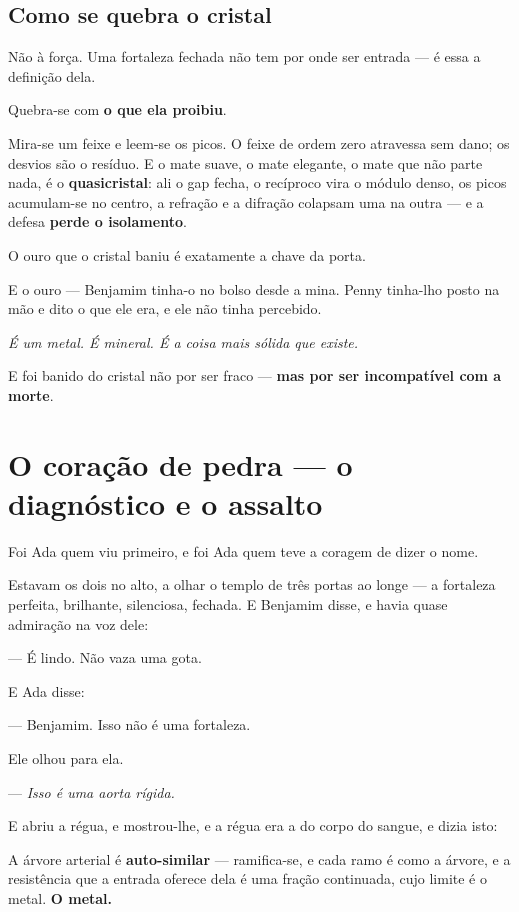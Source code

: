 \documentclass[livro.tex]{subfiles}
\begin{document}
\section*{Como se quebra o cristal}

Não à força. Uma fortaleza fechada não tem por onde ser entrada --- é essa a definição dela.

Quebra-se com \textbf{o que ela proibiu}.

Mira-se um feixe e leem-se os picos. O feixe de ordem zero atravessa sem dano; os desvios são o resíduo. E o mate
suave, o mate elegante, o mate que não parte nada, é o \textbf{quasicristal}: ali o gap fecha, o recíproco vira o
módulo denso, os picos acumulam-se no centro, a refração e a difração colapsam uma na outra --- e a
defesa \textbf{perde o isolamento}.

O ouro que o cristal baniu é exatamente a chave da porta.

E o ouro --- Benjamim tinha-o no bolso desde a mina. Penny tinha-lho posto na mão e
dito o que ele era, e ele não tinha percebido.

\emph{É um metal. É mineral. É a coisa mais sólida que existe.}

E foi banido do cristal não por ser fraco --- \textbf{mas por ser incompatível com a morte}.


\chapter{O coração de pedra --- o diagnóstico e o assalto}

Foi Ada quem viu primeiro, e foi Ada quem teve a coragem de dizer o nome.

Estavam os dois no alto, a olhar o templo de três portas ao longe --- a fortaleza perfeita, brilhante, silenciosa,
fechada. E Benjamim disse, e havia quase admiração na voz dele:

--- É lindo. Não vaza uma gota.

E Ada disse:

--- Benjamim. Isso não é uma fortaleza.

Ele olhou para ela.

--- \emph{Isso é uma aorta rígida.}

\medskip

E abriu a régua, e mostrou-lhe, e a régua era a do corpo do sangue, e dizia isto:

A árvore arterial é \textbf{auto-similar} --- ramifica-se, e cada ramo é como a árvore, e a resistência que a entrada oferece
dela é uma fração continuada,
cujo limite é o metal. \textbf{O metal.}
\end{document}
